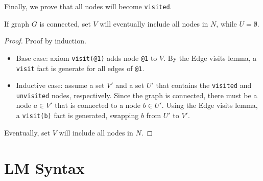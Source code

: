 Finally, we prove that all nodes will become \texttt{visited}.

\begin{theorem}
If graph $G$ is connected, set $V$ will eventually include all nodes in $N$,
while $U = \emptyset$.
\end{theorem}
\begin{proof}
Proof by induction.

\begin{itemize}
   \item Base case: axiom \texttt{visit(@1)} adds node \texttt{@1} to $V$. By
   the Edge visits lemma, a \texttt{visit} fact is generate for all edges of
   \texttt{@1}.
   \item Inductive case: assume a set $V'$ and a set $U'$ that contains the
   \texttt{visited} and \texttt{unvisited} nodes, respectively. Since the graph
   is connected, there must be a node $a \in V'$ that is connected to a node $b
   \in U'$. Using the Edge visits lemma, a \texttt{visit(b)} fact is generated,
   swapping $b$ from $U'$ to $V'$.
\end{itemize}

Eventually, set $V$ will include all nodes in $N$.
\end{proof}

\section{LM Syntax}

